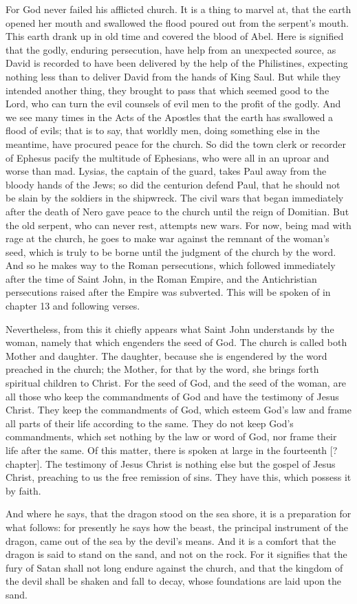 For God never failed his afflicted church. It is a thing to marvel at, that the earth opened her mouth and swallowed the flood poured out from the serpent’s mouth. This earth drank up in old time and covered the blood of Abel. Here is signified that the godly, enduring persecution, have help from an unexpected source, as David is recorded to have been delivered by the help of the Philistines, expecting nothing less than to deliver David from the hands of King Saul. But while they intended another thing, they brought to pass that which seemed good to the Lord, who can turn the evil counsels of evil men to the profit of the godly. And we see many times in the Acts of the Apostles that the earth has swallowed a flood of evils; that is to say, that worldly men, doing something else in the meantime, have procured peace for the church. So did the town clerk or recorder of Ephesus pacify the multitude of Ephesians, who were all in an uproar and worse than mad. Lysias, the captain of the guard, takes Paul away from the bloody hands of the Jews; so did the centurion defend Paul, that he should not be slain by the soldiers in the shipwreck. The civil wars that began immediately after the death of Nero gave peace to the church until the reign of Domitian. But the old serpent, who can never rest, attempts new wars. For now, being mad with rage at the church, he goes to make war against the remnant of the woman’s seed, which is truly to be borne until the judgment of the church by the word. And so he makes way to the Roman persecutions, which followed immediately after the time of Saint John, in the Roman Empire, and the Antichristian persecutions raised after the Empire was subverted. This will be spoken of in chapter 13 and following verses.

Nevertheless, from this it chiefly appears what Saint John understands by the woman, namely that which engenders the seed of God. The church is called both Mother and daughter. The daughter, because she is engendered by the word preached in the church; the Mother, for that by the word, she brings forth spiritual children to Christ. For the seed of God, and the seed of the woman, are all those who keep the commandments of God and have the testimony of Jesus Christ. They keep the commandments of God, which esteem God’s law and frame all parts of their life according to the same. They do not keep God’s commandments, which set nothing by the law or word of God, nor frame their life after the same. Of this matter, there is spoken at large in the fourteenth [?chapter]. The testimony of Jesus Christ is nothing else but the gospel of Jesus Christ, preaching to us the free remission of sins. They have this, which possess it by faith.

And where he says, that the dragon stood on the sea shore, it is a preparation for what follows: for presently he says how the beast, the principal instrument of the dragon, came out of the sea by the devil’s means. And it is a comfort that the dragon is said to stand on the sand, and not on the rock. For it signifies that the fury of Satan shall not long endure against the church, and that the kingdom of the devil shall be shaken and fall to decay, whose foundations are laid upon the sand.
